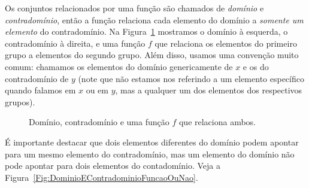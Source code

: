 Os conjuntos relacionados por uma função são chamados de \emph{domínio} e \emph{contradomínio}, então a função relaciona cada elemento do domínio a \emph{somente um elemento} do contradomínio. Na Figura~\ref{Fig:Funcao} mostramos o domínio à esquerda, o contradomínio à direita, e uma função $f$ que relaciona os elementos do primeiro grupo a elementos do segundo grupo. Além disso, usamos uma convenção muito comum: chamamos os elementos do domínio genericamente de $x$ e os do contradomínio de $y$ (note que não estamos nos referindo a um elemento específico quando falamos em $x$ ou em $y$, mas a qualquer um dos elementos dos respectivos grupos).
\begin{figure}[t]
\centering
{}
\caption{Domínio, contradomínio e uma função $f$ que relaciona ambos.\label{Fig:Funcao}}
\end{figure}

É importante destacar que dois elementos diferentes do domínio podem apontar para um mesmo elemento do contradomínio, mas um elemento do domínio não pode apontar para dois elementos do contadomínio. Veja a Figura~\ref{Fig:DominioEContradominioFuncaoOuNao}.


